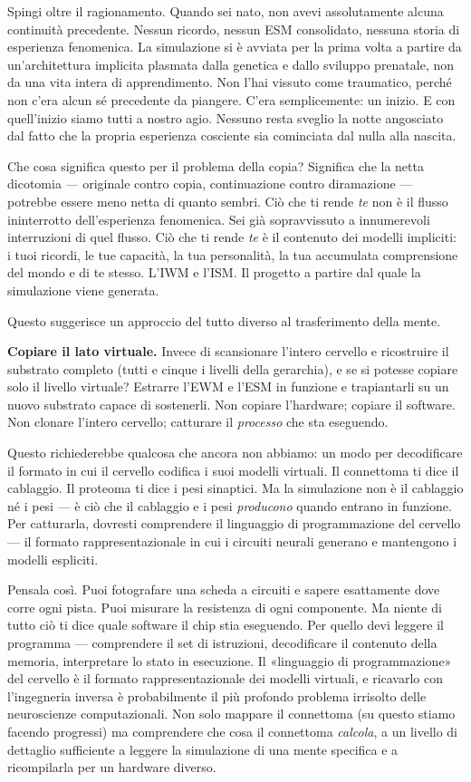 \documentclass[11pt, twoside, openright]{book}
\begin{document}
Spingi oltre il ragionamento. Quando sei nato, non avevi assolutamente alcuna continuità precedente. Nessun ricordo, nessun ESM consolidato, nessuna storia di esperienza fenomenica. La simulazione si è avviata per la prima volta a partire da un'architettura implicita plasmata dalla genetica e dallo sviluppo prenatale, non da una vita intera di apprendimento. Non l'hai vissuto come traumatico, perché non c'era alcun sé precedente da piangere. C'era semplicemente: un inizio. E con quell'inizio siamo tutti a nostro agio. Nessuno resta sveglio la notte angosciato dal fatto che la propria esperienza cosciente sia cominciata dal nulla alla nascita.

Che cosa significa questo per il problema della copia? Significa che la netta dicotomia --- originale contro copia, continuazione contro diramazione --- potrebbe essere meno netta di quanto sembri. Ciò che ti rende \textit{te} non è il flusso ininterrotto dell'esperienza fenomenica. Sei già sopravvissuto a innumerevoli interruzioni di quel flusso. Ciò che ti rende \textit{te} è il contenuto dei modelli impliciti: i tuoi ricordi, le tue capacità, la tua personalità, la tua accumulata comprensione del mondo e di te stesso. L'IWM e l'ISM. Il progetto a partire dal quale la simulazione viene generata.

Questo suggerisce un approccio del tutto diverso al trasferimento della mente.

\textbf{Copiare il lato virtuale.} Invece di scansionare l'intero cervello e ricostruire il substrato completo (tutti e cinque i livelli della gerarchia), e se si potesse copiare solo il livello virtuale? Estrarre l'EWM e l'ESM in funzione e trapiantarli su un nuovo substrato capace di sostenerli. Non copiare l'hardware; copiare il software. Non clonare l'intero cervello; catturare il \textit{processo} che sta eseguendo.

Questo richiederebbe qualcosa che ancora non abbiamo: un modo per decodificare il formato in cui il cervello codifica i suoi modelli virtuali. Il connettoma ti dice il cablaggio. Il proteoma ti dice i pesi sinaptici. Ma la simulazione non è il cablaggio né i pesi --- è ciò che il cablaggio e i pesi \textit{producono} quando entrano in funzione. Per catturarla, dovresti comprendere il linguaggio di programmazione del cervello --- il formato rappresentazionale in cui i circuiti neurali generano e mantengono i modelli espliciti.

Pensala così. Puoi fotografare una scheda a circuiti e sapere esattamente dove corre ogni pista. Puoi misurare la resistenza di ogni componente. Ma niente di tutto ciò ti dice quale software il chip stia eseguendo. Per quello devi leggere il programma --- comprendere il set di istruzioni, decodificare il contenuto della memoria, interpretare lo stato in esecuzione. Il «linguaggio di programmazione» del cervello è il formato rappresentazionale dei modelli virtuali, e ricavarlo con l'ingegneria inversa è probabilmente il più profondo problema irrisolto delle neuroscienze computazionali. Non solo mappare il connettoma (su questo stiamo facendo progressi) ma comprendere che cosa il connettoma \textit{calcola}, a un livello di dettaglio sufficiente a leggere la simulazione di una mente specifica e a ricompilarla per un hardware diverso.
\end{document}
